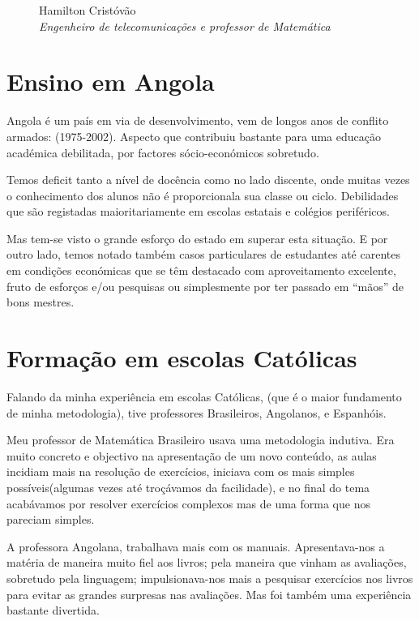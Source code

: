 \begin{figure}
\begin{figurebox}
    Hamilton Cristóvão\\ 
     {\sl\small Engenheiro de telecomunicações e professor de Matemática}
    \vspace{1pt}
  \end{figurebox}
 \vspace{-20pt}
\end{figure}

\section{Ensino em Angola}
Angola é um país em via de desenvolvimento, vem de longos anos de conflito armados: (1975-2002). Aspecto que contribuiu bastante para uma educação académica debilitada, por factores sócio-económicos sobretudo.

Temos deficit tanto a nível de docência como no lado discente, onde muitas vezes o conhecimento dos alunos não é proporcionala  sua classe ou ciclo. Debilidades que são registadas maioritariamente em escolas estatais e colégios periféricos.

Mas tem-se visto o grande esforço do estado em superar esta situação. E por outro lado, temos notado também casos particulares de estudantes até carentes em condições económicas que se têm destacado com aproveitamento excelente, fruto de esforços e/ou pesquisas ou simplesmente por ter passado em “mãos” de bons mestres.

\section{Formação em escolas Católicas}

Falando da minha experiência em escolas Católicas, (que é o maior fundamento de minha metodologia), tive professores Brasileiros, Angolanos, e Espanhóis.

Meu professor de Matemática Brasileiro usava uma metodologia indutiva. Era muito concreto e objectivo na apresentação de um novo conteúdo, as aulas incidiam mais na resolução de exercícios, iniciava com os mais simples possíveis(algumas vezes até troçávamos da facilidade), e no final do tema acabávamos por resolver exercícios complexos mas de uma forma que nos pareciam simples.

A professora Angolana, trabalhava mais com os manuais. Apresentava-nos a matéria de maneira muito fiel aos livros; pela maneira que vinham as avaliações, sobretudo pela linguagem; impulsionava-nos mais a pesquisar exercícios nos livros para evitar as grandes surpresas nas avaliações. Mas foi também uma experiência bastante divertida.

